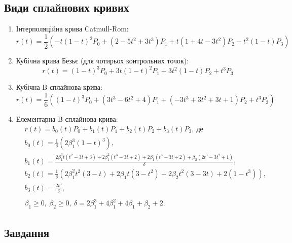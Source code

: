 \documentclass[a4paper,14pt]{extarticle} %
\begin{document}
\subsection*{Види сплайнових кривих}

\begin{enumerate}
    \item Інтерполяційна крива Catmull-Rom: 
    \[ r(t)=\frac{1}{2}\left( -t(1-t)^2P_0 + (2-5t^2+3t^3)P_1 + t(1+4t-3t^2)P_2 - t^2(1-t)P_3 \right) \]
    \item Кубічна крива Безьє (для чотирьох контрольних точок):
    \[ r(t)=(1-t)^3 P_0 + 3t(1-t)^2 P_1 + 3t^2(1-t) P_2 + t^3 P_3 \]
    \item Кубічна B-сплайнова крива:
    \[ r(t)=\frac{1}{6}\left( (1-t)^3 P_0 + (3t^3-6t^2+4)P_1 + (-3t^3+3t^2+3t+1)P_2 + t^3 P_3 \right) \]
    \item Елементарна B-сплайнова крива:
    \begin{align*}
        &r(t)=b_0(t)P_0 + b_1(t)P_1 + b_2(t)P_2 + b_3(t)P_3,\ \text{де} \\
        &b_0(t)=\frac{1}{\delta}\left( 2\beta_1^3(1-t)^3 \right), \\
        &b_1(t)=\frac{2\beta_1^3t(t^2-3t+3) + 2\beta_1^2(t^3-3t+2) + 2\beta_1(t^3-3t+2) + \beta_2(2t^3-3t^2+1)}{\delta}, \\
        &b_2(t)=\frac{1}{\delta}\left( 2\beta_1^2t^2(3-t) + 2\beta_1t(3-t^2) + 2\beta_2t^2(3-3t) + 2(1-t^3)  \right), \\
        &b_3(t)=\frac{2t^3}{\delta}, \\ \\
        &\beta_1\geqslant 0,\ \beta_2\geqslant 0,\ \delta=2\beta_1^3 + 4\beta_1^2 + 4\beta_1 + \beta_2 + 2. 
    \end{align*}
\end{enumerate}

\subsection*{Завдання}
\end{document}
